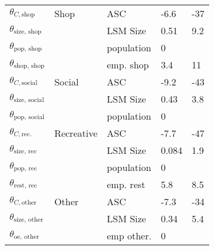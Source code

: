 \begin{table}
\begin{tabular}{p{\pa}p{\pb}p{\pc}p{\pd}p{\pe}}
$\theta_{C,\text{shop}}$                & Shop & ASC                               &              -6.6 &                -37 \\
$\theta_{\text{size, shop}}$            & & LSM Size                               &              0.51 &                9.2 \\
$\theta_{\text{pop, shop}}$             & & population                             &               0  &                    \\
$\theta_{\text{shop, shop}}$            & & emp. shop                       &               3.4 &                 11 \\
\noalign{\smallskip}
$\theta_{C,\text{social}}$              & Social & ASC                             &              -9.2 &                -43 \\
$\theta_{\text{size, social}}$          & & LSM Size                               &              0.43 &                3.8 \\
$\theta_{\text{pop, social}}$           & & population                             &                 0    &                    \\
\noalign{\smallskip}
$\theta_{C,\text{rec.}}$                & Recreative & ASC                         &              -7.7 &                -47 \\
$\theta_{\text{size, rec}}$             & & LSM Size                               &             0.084 &                1.9 \\
$\theta_{\text{pop, rec}}$              & & population                             &               0      &                    \\
$\theta_{\text{rest, rec}}$             & & emp. rest                      &               5.8 &                8.5 \\
\noalign{\smallskip}
$\theta_{C,\text{other}}$               & Other & ASC                              &              -7.3 &                -34 \\
$\theta_{\text{size, other}}$           & &  LSM Size                              &              0.34 &                5.4 \\
$\theta_{\text{oe, other}}$              & & emp other.                    &               0      &                    \\

    \end{tabular}

\end{table}

